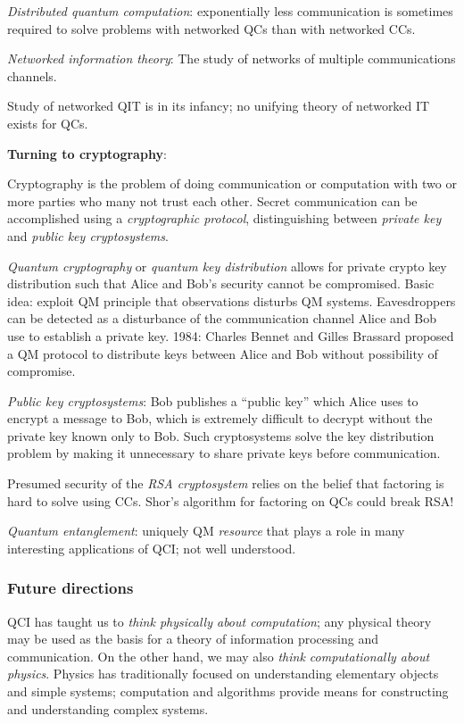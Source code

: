 \documentclass{article}
\begin{document}
\textit{Distributed quantum computation}: exponentially less communication is sometimes required to solve problems with networked QCs than with networked CCs.

\textit{Networked information theory}: The study of networks of multiple communications channels.

Study of networked QIT is in its infancy; no unifying theory of networked IT exists for QCs. 

\textbf{Turning to cryptography}:

Cryptography is the problem of doing communication or computation with two or more parties who many not trust each other. Secret communication can be accomplished using a \textit{cryptographic protocol}, distinguishing between \textit{private key} and \textit{public key cryptosystems}.

\textit{Quantum cryptography} or \textit{quantum key distribution} allows for private crypto key distribution such that Alice and Bob's security cannot be compromised. Basic idea: exploit QM principle that observations disturbs QM systems. Eavesdroppers can be detected as a disturbance of the communication channel Alice and Bob use to establish a private key. 1984: Charles Bennet and Gilles Brassard proposed a QM protocol to distribute keys between Alice and Bob without possibility of compromise.

\textit{Public key cryptosystems}: Bob publishes a ``public key'' which Alice uses to encrypt a message to Bob, which is extremely difficult to decrypt without the private key known only to Bob. Such cryptosystems solve the key distribution problem by making it unnecessary to share private keys before communication.

Presumed security of the \textit{RSA cryptosystem} relies on the belief that factoring is hard to solve using CCs. Shor's algorithm for factoring on QCs could break RSA!

\textit{Quantum entanglement}: uniquely QM \textit{resource} that plays a role in many interesting applications of QCI; not well understood.

\subsubsection{Future directions}

QCI has taught us to \textit{think physically about computation}; any physical theory may be used as the basis for a theory of information processing and communication. On the other hand, we may also \textit{think computationally about physics}. Physics has traditionally focused on understanding elementary objects and simple systems; computation and algorithms provide means for constructing and understanding complex systems.
\end{document}
